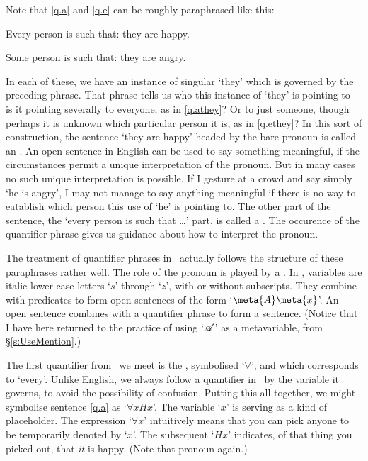 Note that \ref{q.a} and \ref{q.e} can be roughly paraphrased like this: \begin{earg}
	\item[\ex{q.athey}] Every person is such that: they are happy.
	\item[\ex{q.ethey}] Some person is such that: they are angry.
\end{earg} In each of these, we have an instance of singular `they' which is governed by the preceding phrase. That phrase tells us who this instance of `they' is pointing to – is it pointing severally to everyone, as in \ref{q.athey}? Or to just someone, though perhaps it is unknown which particular person it is, as in \ref{q.ethey}? In this sort of construction, the sentence `they are happy' headed by the bare pronoun is called an .  An open sentence in English can be used to say something meaningful, if the circumstances permit a unique interpretation of the pronoun. But in many cases no such unique interpretation is possible. If I gesture at a crowd and say simply `he is angry', I may not manage to say anything meaningful if there is no way to eatablish which person this use of `he' is pointing to. The other part of the sentence, the `every person is such that …' part, is called a . The occurence of the quantifier phrase gives us guidance about how to interpret the pronoun. 

The treatment of quantifier phrases in \FOL\ actually follows the structure of these paraphrases rather well. The role of the pronoun is played by a . In \FOL, variables are italic lower case letters `$s$' through `$z$', with or without subscripts. They combine with predicates to form open sentences of the form `$\meta{A}\meta{x}$'. An open sentence combines with a quantifier phrase to form a sentence. (Notice that I have here returned to the practice of using `$\mathscr{A}$' as a metavariable, from §\ref{s:UseMention}.)

The first quantifier from \FOL\ we meet is the , symbolised `$\forall$', and which corresponds to `every'. Unlike English, we always follow a quantifier in \FOL\ by the variable it governs, to avoid the possibility of confusion. Putting this all together, we might symbolise sentence \ref{q.a} as `$\forall x Hx$'.  The variable `$x$' is serving as a kind of placeholder. The expression `$\forall x$' intuitively means that you can pick anyone to be temporarily denoted by `$x$'. The subsequent `$Hx$' indicates, of that thing you picked out, that \emph{it} is happy. (Note that pronoun again.)

